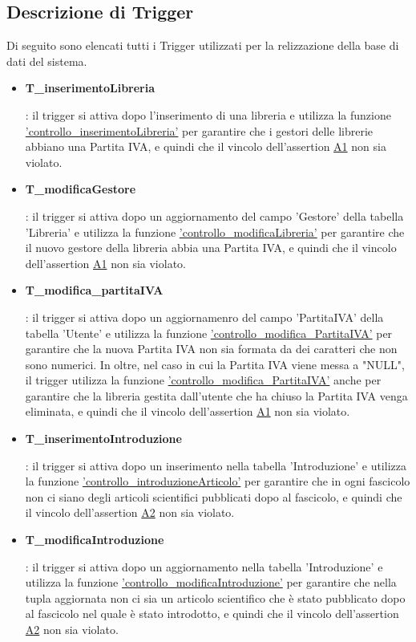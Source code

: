 \documentclass{article}
\begin{document}
\subsection{Descrizione di Trigger}
Di seguito sono elencati tutti i Trigger utilizzati per la relizzazione della base di dati del sistema.
\begin{itemize}
    \item \hypertarget{t1}{\textbf{T\_inserimentoLibreria}}: il trigger si attiva dopo l'inserimento di una libreria e utilizza la funzione \hyperlink{f1}{'controllo\_inserimentoLibreria'} per garantire che i gestori delle librerie abbiano una Partita IVA, e quindi che il vincolo dell'assertion \hyperlink{assertion1}{A1} non sia violato.
    
    \item \hypertarget{t2}{\textbf{T\_modificaGestore}}: il trigger si attiva dopo un aggiornamento del campo 'Gestore' della tabella 'Libreria' e utilizza la funzione \hyperlink{f2}{'controllo\_modificaLibreria'} per garantire che il nuovo gestore della libreria abbia una Partita IVA, e quindi che il vincolo dell'assertion \hyperlink{assertion1}{A1} non sia violato. 

    \item \hypertarget{t3}{\textbf{T\_modifica\_partitaIVA}}: il trigger si attiva dopo un aggiornamenro del campo 'PartitaIVA' della tabella 'Utente' e utilizza la funzione \hyperlink{f3}{'controllo\_modifica\_PartitaIVA'} per garantire che la nuova Partita IVA non sia formata da dei caratteri che non sono numerici. In oltre, nel caso in cui la Partita IVA viene messa a "NULL", il trigger utilizza la funzione \hyperlink{f3}{'controllo\_modifica\_PartitaIVA'} anche per garantire che la libreria gestita dall'utente che ha chiuso la Partita IVA venga eliminata, e quindi che il vincolo dell'assertion \hyperlink{assertion1}{A1} non sia violato.

    \item \hypertarget{t4}{\textbf{T\_inserimentoIntroduzione}}: il trigger si attiva dopo un inserimento nella tabella 'Introduzione' e utilizza la funzione \hyperlink{f4}{'controllo\_introduzioneArticolo'} per garantire che in ogni fascicolo non ci siano degli articoli scientifici pubblicati dopo al fascicolo, e quindi che il vincolo dell'assertion \hyperlink{assertion2}{A2} non sia violato.

    \item \hypertarget{t5}{\textbf{T\_modificaIntroduzione}}: il trigger si attiva dopo un aggiornamento nella tabella 'Introduzione' e utilizza la funzione \hyperlink{f5}{'controllo\_modificaIntroduzione'} per garantire che nella tupla aggiornata non ci sia un articolo scientifico che è stato pubblicato dopo al fascicolo nel quale è stato introdotto, e quindi che il vincolo dell'assertion \hyperlink{assertion2}{A2} non sia violato.


\end{itemize}
\end{document}
